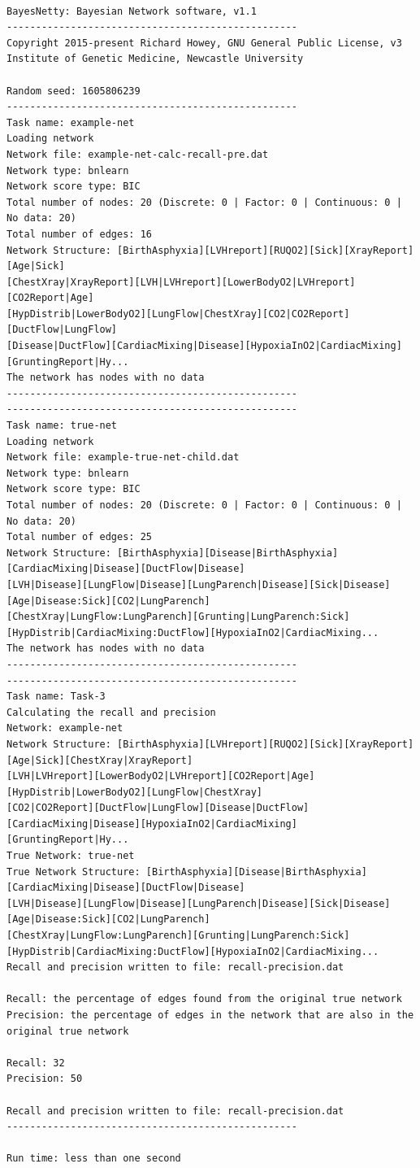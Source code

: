 \documentclass[a4paper,12pt]{article}
\begin{document}
\vspace{0.35cm} \begin{lstlisting}

BayesNetty: Bayesian Network software, v1.1
--------------------------------------------------
Copyright 2015-present Richard Howey, GNU General Public License, v3
Institute of Genetic Medicine, Newcastle University

Random seed: 1605806239
--------------------------------------------------
Task name: example-net
Loading network
Network file: example-net-calc-recall-pre.dat
Network type: bnlearn
Network score type: BIC
Total number of nodes: 20 (Discrete: 0 | Factor: 0 | Continuous: 0 | No data: 20)
Total number of edges: 16
Network Structure: [BirthAsphyxia][LVHreport][RUQO2][Sick][XrayReport][Age|Sick]
[ChestXray|XrayReport][LVH|LVHreport][LowerBodyO2|LVHreport][CO2Report|Age]
[HypDistrib|LowerBodyO2][LungFlow|ChestXray][CO2|CO2Report][DuctFlow|LungFlow]
[Disease|DuctFlow][CardiacMixing|Disease][HypoxiaInO2|CardiacMixing][GruntingReport|Hy...
The network has nodes with no data
--------------------------------------------------
--------------------------------------------------
Task name: true-net
Loading network
Network file: example-true-net-child.dat
Network type: bnlearn
Network score type: BIC
Total number of nodes: 20 (Discrete: 0 | Factor: 0 | Continuous: 0 | No data: 20)
Total number of edges: 25
Network Structure: [BirthAsphyxia][Disease|BirthAsphyxia][CardiacMixing|Disease][DuctFlow|Disease]
[LVH|Disease][LungFlow|Disease][LungParench|Disease][Sick|Disease][Age|Disease:Sick][CO2|LungParench]
[ChestXray|LungFlow:LungParench][Grunting|LungParench:Sick][HypDistrib|CardiacMixing:DuctFlow][HypoxiaInO2|CardiacMixing...
The network has nodes with no data
--------------------------------------------------
--------------------------------------------------
Task name: Task-3
Calculating the recall and precision
Network: example-net
Network Structure: [BirthAsphyxia][LVHreport][RUQO2][Sick][XrayReport][Age|Sick][ChestXray|XrayReport]
[LVH|LVHreport][LowerBodyO2|LVHreport][CO2Report|Age][HypDistrib|LowerBodyO2][LungFlow|ChestXray]
[CO2|CO2Report][DuctFlow|LungFlow][Disease|DuctFlow][CardiacMixing|Disease][HypoxiaInO2|CardiacMixing][GruntingReport|Hy...
True Network: true-net
True Network Structure: [BirthAsphyxia][Disease|BirthAsphyxia][CardiacMixing|Disease][DuctFlow|Disease]
[LVH|Disease][LungFlow|Disease][LungParench|Disease][Sick|Disease][Age|Disease:Sick][CO2|LungParench]
[ChestXray|LungFlow:LungParench][Grunting|LungParench:Sick][HypDistrib|CardiacMixing:DuctFlow][HypoxiaInO2|CardiacMixing...
Recall and precision written to file: recall-precision.dat

Recall: the percentage of edges found from the original true network
Precision: the percentage of edges in the network that are also in the original true network

Recall: 32
Precision: 50

Recall and precision written to file: recall-precision.dat
--------------------------------------------------

Run time: less than one second

\end{lstlisting} \vspace{0.35cm}
\end{document}
